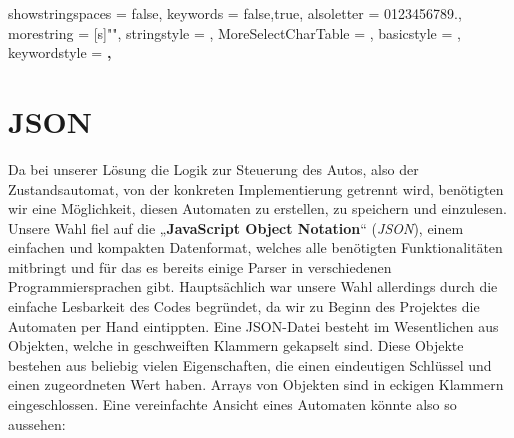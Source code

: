 \newcommand\JSONnumbervaluestyle{\color{blue}}
\newcommand\JSONstringvaluestyle{\color{red}}

\newif\ifcolonfoundonthisline

\makeatletter

{
  showstringspaces    = false,
  keywords            = {false,true},
  alsoletter          = 0123456789.,
  morestring          = [s]{"}{"},
  stringstyle         = \ifcolonfoundonthisline\JSONstringvaluestyle\fi,
  MoreSelectCharTable =%
    \colon@json{\processColon@json},
  basicstyle          = \ttfamily,
  keywordstyle        = \ttfamily\bfseries,
}

\newcommand\processColon@json{%
  \colon@json%
  \ifnum\lst@mode=\lst@Pmode%
    \global\colonfoundonthislinetrue%
  \fi
}

\lst@AddToHook{Output}{%
  \ifcolonfoundonthisline%
    \ifnum\lst@mode=\lst@Pmode%
      \def\lst@thestyle{\JSONnumbervaluestyle}%
    \fi
  \fi
  \lsthk@DetectKeywords%
}

%
  {\global\colonfoundonthislinefalse}

\makeatother

\section{JSON}
\label{sec:json}
Da bei unserer Lösung die Logik zur Steuerung des Autos, also der
Zustandsautomat, von der konkreten Implementierung getrennt wird, benötigten
wir eine Möglichkeit, diesen Automaten zu erstellen, zu speichern und einzulesen.
Unsere Wahl fiel auf die „\textbf{JavaScript Object Notation}“ (\textit{JSON}), einem
einfachen und kompakten Datenformat, welches alle benötigten Funktionalitäten
mitbringt und für das es bereits einige Parser in verschiedenen
Programmiersprachen gibt. Hauptsächlich war unsere Wahl allerdings durch die
einfache Lesbarkeit des Codes begründet, da wir zu Beginn des Projektes die
Automaten per Hand eintippten.
Eine JSON-Datei besteht im Wesentlichen aus Objekten, welche in geschweiften
Klammern gekapselt sind. Diese Objekte bestehen aus beliebig vielen
Eigenschaften, die einen eindeutigen Schlüssel und einen zugeordneten Wert
haben. Arrays von Objekten sind in eckigen Klammern eingeschlossen. Eine
vereinfachte Ansicht eines Automaten könnte also so aussehen:


